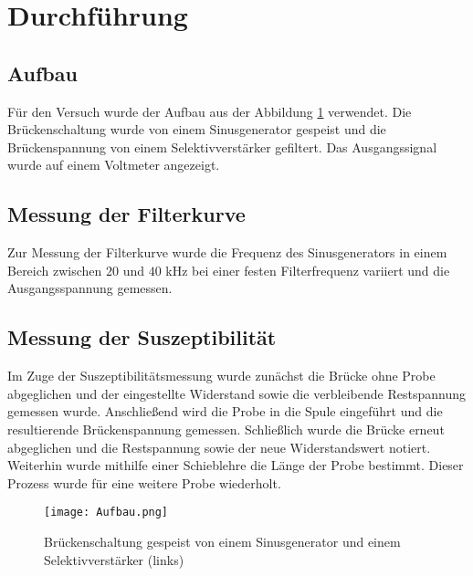 \section{Durchführung}
\subsection{Aufbau}
Für den Versuch wurde der Aufbau aus der Abbildung \ref{fig:block} verwendet. Die Brückenschaltung wurde von einem Sinusgenerator gespeist und die Brückenspannung von einem Selektivverstärker gefiltert. Das Ausgangssignal wurde auf einem Voltmeter angezeigt.
\subsection{Messung der Filterkurve}
Zur Messung der Filterkurve wurde die Frequenz des Sinusgenerators in einem Bereich zwischen $20$ und $40$ kHz bei einer festen Filterfrequenz variiert und die Ausgangsspannung gemessen.
\subsection{Messung der Suszeptibilität}
Im Zuge der Suszeptibilitätsmessung wurde zunächst die Brücke ohne Probe abgeglichen und der eingestellte Widerstand
sowie die verbleibende Restspannung gemessen wurde. Anschließend wird die Probe in die Spule eingeführt und die resultierende Brückenspannung gemessen. Schließlich wurde die Brücke erneut abgeglichen und die Restspannung sowie der neue Widerstandswert notiert. Weiterhin wurde mithilfe einer Schieblehre die Länge der Probe bestimmt. Dieser Prozess wurde für eine weitere Probe wiederholt.
\begin{figure}[h]
    
    \centering
    \texttt{[image: Aufbau.png]}
    \caption{Brückenschaltung gespeist von einem Sinusgenerator und einem Selektivverstärker (links)}
    \label{fig:block}
\end{figure}

